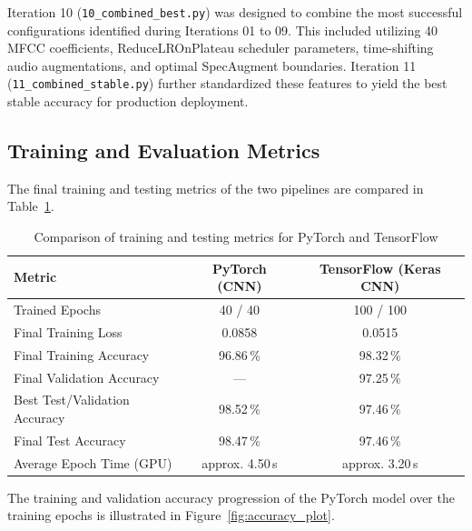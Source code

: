 \documentclass[11pt,a4paper]{article}
\begin{document}
Iteration 10 (\texttt{10\_combined\_best.py}) was designed to combine the most successful configurations identified during Iterations 01 to 09. This included utilizing 40 MFCC coefficients, ReduceLROnPlateau scheduler parameters, time-shifting audio augmentations, and optimal SpecAugment boundaries. Iteration 11 (\texttt{11\_combined\_stable.py}) further standardized these features to yield the best stable accuracy for production deployment.

\subsection{Training and Evaluation Metrics}
The final training and testing metrics of the two pipelines are compared in Table~\ref{tab:metrics_comparison}.

\begin{table}[h!]
    \centering
    \caption{Comparison of training and testing metrics for PyTorch and TensorFlow}
    \label{tab:metrics_comparison}
    \begin{tabular}{lcc}
        \toprule
        \textbf{Metric}               & \textbf{PyTorch (CNN)} & \textbf{TensorFlow (Keras CNN)} \\
        \midrule
        Trained Epochs                & 40 / 40                & 100 / 100                       \\
        Final Training Loss           & 0.0858                 & 0.0515                          \\
        Final Training Accuracy       & 96.86\,\%              & 98.32\,\%                       \\
        Final Validation Accuracy     & ---                    & 97.25\,\%                       \\
        Best Test/Validation Accuracy & 98.52\,\%              & 97.46\,\%                       \\
        Final Test Accuracy           & 98.47\,\%              & 97.46\,\%                       \\
        Average Epoch Time (GPU)      & approx. 4.50\,s        & approx. 3.20\,s                 \\
        \bottomrule
    \end{tabular}
\end{table}

The training and validation accuracy progression of the PyTorch model over the training epochs is illustrated in Figure~\ref{fig:accuracy_plot}.
\end{document}
